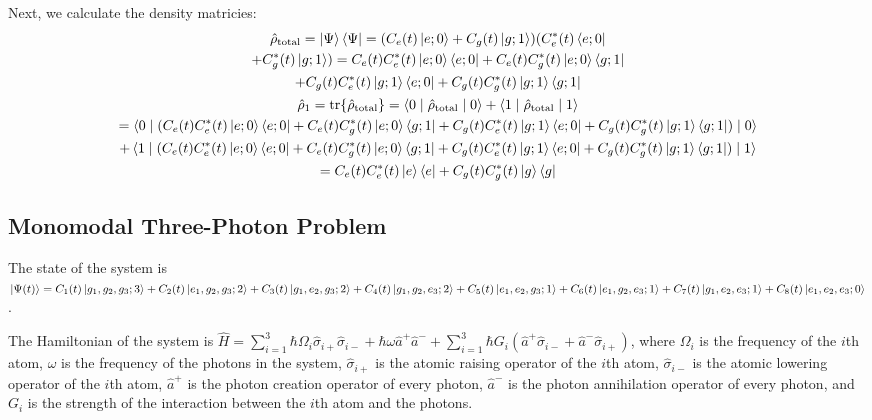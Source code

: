 \documentclass{article}
\theoremstyle{definition}
\begin{document}
Next, we calculate the density matricies:
\begin{gather*}
\hat{\rho}_{\text{total}} = \ket{\Psi}\bra{\Psi} = (C_{e}(t)\ket{e; 0} + C_{g}(t)\ket{g; 1})(C_{e}^{*}(t)\bra{e; 0}\\
 + C_{g}^{*}(t)\ket{g; 1}) = C_{e}(t)C_{e}^{*}(t)\ket{e; 0}\bra{e; 0} + C_{e}(t)C_{g}^{*}(t)\ket{e; 0}\bra{g; 1}\\
 + C_{g}(t)C_{e}^{*}(t)\ket{g; 1}\bra{e; 0} + C_{g}(t)C_{g}^{*}(t)\ket{g; 1}\bra{g; 1}\\
\hat{\rho}_{1} = \mathrm{tr}\{ \hat{\rho}_{\text{total}} \} = \braket{0 \mid \hat{\rho}_{\text{total}} \mid 0} + \braket{1 \mid \hat{\rho}_{\text{total}} \mid 1}\\
 = \braket{0 \mid (C_{e}(t)C_{e}^{*}(t)\ket{e; 0}\bra{e; 0} + C_{e}(t)C_{g}^{*}(t)\ket{e; 0}\bra{g; 1} + C_{g}(t)C_{e}^{*}(t)\ket{g; 1}\bra{e; 0} + C_{g}(t)C_{g}^{*}(t)\ket{g; 1}\bra{g; 1}) \mid 0}\\
  + \braket{1 \mid (C_{e}(t)C_{e}^{*}(t)\ket{e; 0}\bra{e; 0} + C_{e}(t)C_{g}^{*}(t)\ket{e; 0}\bra{g; 1} + C_{g}(t)C_{e}^{*}(t)\ket{g; 1}\bra{e; 0} + C_{g}(t)C_{g}^{*}(t)\ket{g; 1}\bra{g; 1}) \mid 1}\\
  = C_{e}(t)C_{e}^{*}(t)\ket{e}\bra{e} + C_{g}(t)C_{g}^{*}(t)\ket{g}\bra{g}
\end{gather*}

\subsection{Monomodal Three-Photon Problem}

The state of the system is $\ket{\Psi(t)} = C_{1}(t) \ket{g_{1}, g_{2}, g_{3}; 3} + C_{2}(t) \ket{e_{1}, g_{2}, g_{3}; 2} + C_{3}(t) \ket{g_{1}, e_{2}, g_{3}; 2} + C_{4}(t) \ket{g_{1}, g_{2}, e_{3}; 2} + C_{5}(t) \ket{e_{1}, e_{2}, g_{3}; 1} + C_{6}(t) \ket{e_{1}, g_{2}, e_{3}; 1} + C_{7}(t) \ket{g_{1}, e_{2}, e_{3}; 1} + C_{8}(t) \ket{e_{1}, e_{2}, e_{3}; 0}$.

The Hamiltonian of the system is $\hat{H} = \sum_{i = 1}^{3} \hbar \Omega_{i} \hat{\sigma}_{i+}\hat{\sigma}_{i-} + \hbar \omega \hat{a}^{+}\hat{a}^{-} + \sum_{i = 1}^{3} \hbar G_{i} (\hat{a}^{+}\hat{\sigma}_{i-} + \hat{a}^{-}\hat{\sigma}_{i+})$, where $\Omega_{i}$ is the frequency of the $i$th atom, $\omega$ is the frequency of the photons in the system, $\hat{\sigma}_{i+}$ is the atomic raising operator of the $i$th atom, $\hat{\sigma}_{i-}$ is the atomic lowering operator of the $i$th atom, $\hat{a}^{+}$ is the photon creation operator of every photon, $\hat{a}^{-}$ is the photon annihilation operator of every photon, and $G_{i}$ is the strength of the interaction between the $i$th atom and the photons.
\end{document}
